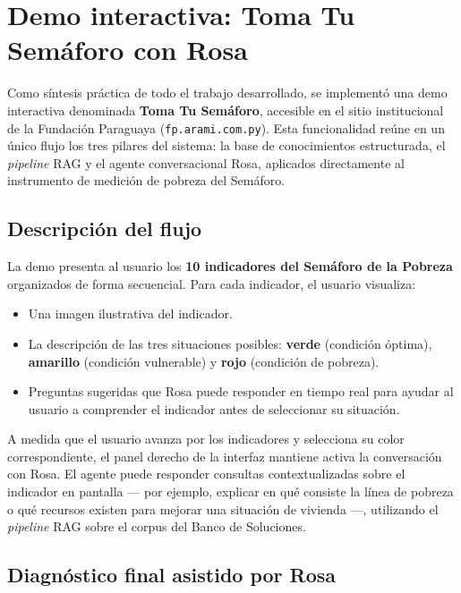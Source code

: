 \section{Demo interactiva: Toma Tu Semáforo con Rosa}\label{sec:demo_semaforo}

Como síntesis práctica de todo el trabajo desarrollado, se implementó una demo interactiva denominada \textbf{Toma Tu Semáforo}, accesible en el sitio institucional de la Fundación Paraguaya (\texttt{fp.arami.com.py}). Esta funcionalidad reúne en un único flujo los tres pilares del sistema: la base de conocimientos estructurada, el \textit{pipeline} RAG y el agente conversacional Rosa, aplicados directamente al instrumento de medición de pobreza del Semáforo.

\subsection{Descripción del flujo}\label{sec:demo_flujo}

La demo presenta al usuario los \textbf{10 indicadores del Semáforo de la Pobreza} organizados de forma secuencial. Para cada indicador, el usuario visualiza:

\begin{itemize}
  \item Una imagen ilustrativa del indicador.
  \item La descripción de las tres situaciones posibles: \textbf{verde} (condición óptima), \textbf{amarillo} (condición vulnerable) y \textbf{rojo} (condición de pobreza).
  \item Preguntas sugeridas que Rosa puede responder en tiempo real para ayudar al usuario a comprender el indicador antes de seleccionar su situación.
\end{itemize}

A medida que el usuario avanza por los indicadores y selecciona su color correspondiente, el panel derecho de la interfaz mantiene activa la conversación con Rosa. El agente puede responder consultas contextualizadas sobre el indicador en pantalla — por ejemplo, explicar en qué consiste la línea de pobreza o qué recursos existen para mejorar una situación de vivienda —, utilizando el \textit{pipeline} RAG sobre el corpus del Banco de Soluciones.

\subsection{Diagnóstico final asistido por Rosa}\label{sec:demo_diagnostico}


